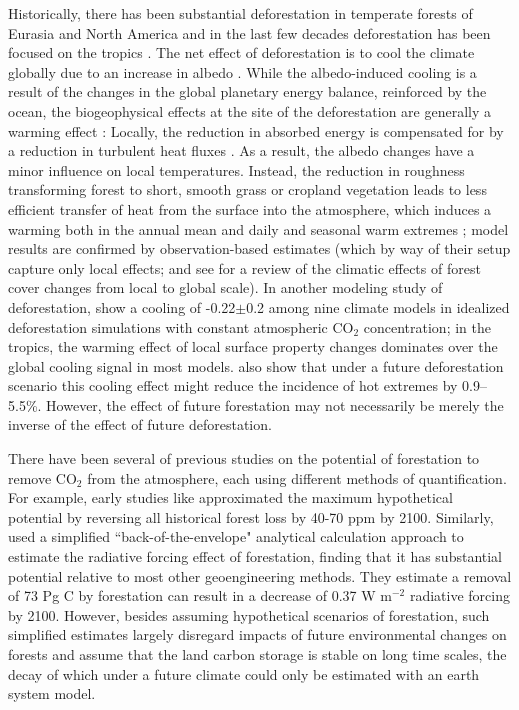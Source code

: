 \documentclass[draft]{agujournal2019}
\begin{document}
Historically, there has been substantial deforestation in temperate forests of Eurasia and North America and in the last few decades deforestation has been focused on the tropics \cite{goldewijk_estimating_2001}.
The net effect of deforestation is to cool the climate globally due to an increase in albedo \cite{davin_climatic_2010}.
While the albedo-induced cooling is a result of the changes in the global planetary energy balance, reinforced by the ocean, the biogeophysical effects at the site of the deforestation are generally a warming effect \cite{winckler_nonlocal_2019}: Locally, the reduction in absorbed energy is compensated for by a reduction in turbulent heat fluxes \cite{winckler_importance_2019}.
As a result, the albedo changes have a minor influence on local temperatures.
Instead, the reduction in roughness transforming forest to short, smooth grass or cropland vegetation leads to less efficient transfer of heat from the surface into the atmosphere, which induces a warming both in the annual mean and daily and seasonal warm extremes \cite{winckler_different_2019}; model results are confirmed by observation-based estimates (which by way of their setup capture only local effects;   and see  for a review of the climatic effects of forest cover changes from local to global scale).
In another modeling study of deforestation,  show a cooling of -0.22$\pm$0.2 \textcelsius{} among nine climate models in idealized deforestation simulations with constant atmospheric CO$_2$ concentration; in the tropics, the warming effect of local surface property changes dominates over the global cooling signal in most models.
 also show that under a future deforestation scenario this cooling effect might reduce the incidence of hot extremes by 0.9--5.5\%.
However, the effect of future forestation may not necessarily be merely the inverse of the effect of future deforestation.

There have been several of previous studies on the potential of forestation to remove CO$_2$ from the atmosphere, each using different methods of quantification.
For example, early studies like  approximated the maximum hypothetical potential by reversing all historical forest loss by 40-70 ppm by 2100. Similarly,  used a simplified ``back-of-the-envelope" analytical calculation approach to estimate the radiative forcing effect of forestation, finding that it has substantial potential relative to most other geoengineering methods.
They estimate a removal of 73 Pg C by forestation can result in a decrease of 0.37 W m$^{-2}$ radiative forcing by 2100.
However, besides assuming hypothetical scenarios of forestation, such simplified estimates largely disregard impacts of future environmental changes on forests and assume that the land carbon storage is stable on long time scales, the decay of which under a future climate could only be estimated with an earth system model.
\end{document}
